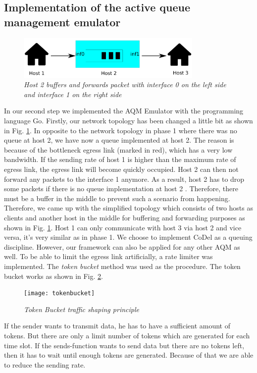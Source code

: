 \subsection{Implementation of the active queue management emulator}
\begin{figure}[htbp]
\centering
\includegraphics*[width=9cm]{topology}
\caption{\em Host 2 buffers and forwards packet with interface 0 on the left side and interface 1 on the right side}
\label{fig:topology_buffer}
\end{figure} 
In our second step we implemented the AQM Emulator with the programming language Go. Firstly, our network topology has been changed a little bit as shown in Fig. \ref{fig:topology_buffer}. In opposite to the network topology in phase 1 where there was no queue at host 2, we have now a queue implemented at host 2. The reason is because of the bottleneck egress link (marked in red), which has a very low bandwidth. If the sending rate of host 1 is higher than the maximum rate of egress link, the egress link will become quickly occupied. Host 2 can then not forward any packets to the interface 1 anymore. As a result, host 2 has to drop some packets if there is no queue implementation at host 2 . Therefore, there must be a buffer in the middle to prevent such a scenario from happening. Therefore, we came up with the simplified topology which consists of two hosts as clients and another host in the middle for buffering and forwarding purposes as shown in Fig. \ref{fig:topology_buffer}. Host 1 can only communicate with host 3 via host 2 and vice versa, it's very similar as in phase 1.
We choose to implement CoDel as a queuing discipline. However, our framework can also be applied for any other AQM as well. To be able to limit the egress link artificially, a rate limiter was implemented. The \textit{token bucket} method was used as the procedure. The token bucket works as shown in Fig. \ref{fig:token_bucket}. 
\begin{figure}[htbp]
\centering
\texttt{[image: tokenbucket]}
\caption{\em Token Bucket traffic shaping principle}
\label{fig:token_bucket}
\end{figure}
If the sender wants to transmit data, he has to have a sufficient amount of tokens. But there are only a limit number of tokens which are generated for each time slot. If the sends-function wants to send data but there are no tokens left, then it has to wait until enough tokens are generated. Because of that we are able to reduce the sending rate. \newline 
